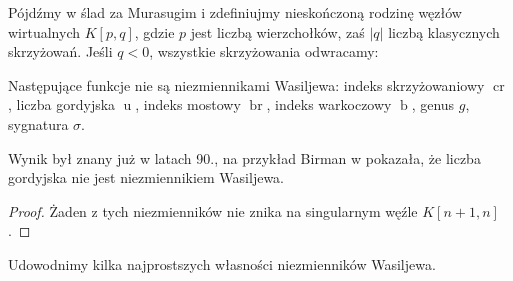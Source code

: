 Pójdźmy w ślad za Murasugim i zdefiniujmy nieskończoną rodzinę węzłów wirtualnych $K[p, q]$, gdzie $p$ jest liczbą wierzchołków, zaś $|q|$ liczbą klasycznych skrzyżowań.
Jeśli $q < 0$, wszystkie skrzyżowania odwracamy:
\begin{comment}
\[
\begin{tikzpicture}[baseline=-0.65ex, scale=0.1]
\begin{knot}[clip width=5, end tolerance=1pt, flip crossing/.list={2}]
    \draw[semithick] (5, 0) [in=-60, out=-120] to (-5, 0) [in=60, out=120] to (-15, 0) [in=-60, out=-120] to (-25, 0) [in=60, out=120] to (-35, 0) [in=180, out=-120] to (-35, -10);
    \draw[semithick] (5, 0) [in=60, out=120] to (-5, 0) [in=-60, out=-120] to (-15, 0) [in=60, out=120] to (-25, 0) [in=-60, out=-120] to (-35, 0) [in=-180, out=120] to (-35, 10);
    \strand[semithick] (5, 0) [in=120, out=60] to (15, 0) [in=-120, out=-60] to (25, 0) [in=120, out=60] to (35, 0) [in=0, out=-60] to (35, -10);
    \strand[semithick] (5, 0) [in=-120, out=-60] to (15, 0) [in=120, out=60] to (25, 0) [in=-120, out=-60] to (35, 0) [in=0, out=60] to (35, 10);
    \draw[semithick,Latex-] (-35, 10) to (35, 10);
    \draw[semithick,Latex-] (-35, -10) to (35, -10);
    \draw[black,fill=black] (5,0) circle (0.5);
    \draw[black,fill=black] (-5,0) circle (0.5);
    \draw[black,fill=black] (-15,0) circle (0.5);
    \draw[black,fill=black] (-25,0) circle (0.5);
    \draw[black,fill=black] (-35,0) circle (0.5);
\end{knot}
\end{tikzpicture}\]
\end{comment}

\begin{proposition}
    Następujące funkcje nie są niezmiennikami Wasiljewa: indeks skrzyżowaniowy $\operatorname{cr}$, liczba gordyjska $\operatorname{u}$, indeks mostowy $\operatorname{br}$, indeks warkoczowy $\operatorname{b}$, genus $g$, sygnatura $\sigma$.
\end{proposition}

Wynik był znany już w latach 90., na przykład Birman w \cite{birman93} pokazała, że liczba gordyjska nie jest niezmiennikiem Wasiljewa.

\begin{proof}
    Żaden z tych niezmienników nie znika na singularnym węźle $K[n+1, n]$.
\end{proof}

Udowodnimy kilka najprostszych własności niezmienników Wasiljewa.

